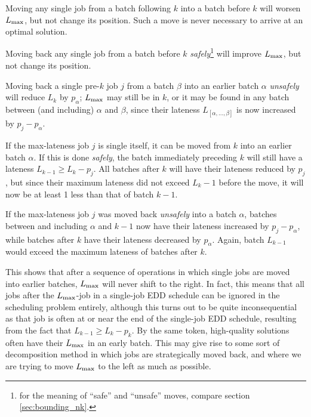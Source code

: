 \begin{alist}
\item{Moving any single job from a batch following $k$ into a batch before $k$ will
worsen $L_{\text{max}}$, but not change its position. Such a move is never necessary to
arrive at an optimal solution.}
\item{Moving back any single job from a
batch before $k$ \textit{safely}\footnote{for the meaning of ``safe'' and
``unsafe'' moves, compare section \ref{sec:bounding_nk}.} will improve $L_{\text{max}}$,
but not change its position.}
\item{Moving back a single pre-$k$ job $j$ from a batch
$\beta$ into an earlier batch $\alpha$ \textit{unsafely} will reduce $L_k$ by
$p_\alpha$; $L_{\text{max}}$ may still be in $k$, or it may be found in any batch between
(and including) $\alpha$ and $\beta$, since their lateness
$L_{[\alpha,\dots,\beta]}$ is now increased by $p_j - p_\alpha$.}
\item{If the
max-lateness job $j$ is single itself, it can be moved from $k$ into an earlier
batch $\alpha$. If this is done \textit{safely}, the batch immediately preceding
$k$ will still have a lateness $L_{k-1} \geq L_k - p_j$. All batches after $k$
will have their lateness reduced by $p_j$, but since their maximum lateness did
not exceed $L_k - 1$ before the move, it will now be at least 1 less than that
of batch $k-1$.}
\item{If the max-lateness job
$j$ was moved back \textit{unsafely} into a batch $\alpha$, batches between and
including $\alpha$ and $k-1$ now have their lateness increased by $p_j - p_\alpha$,
while batches after $k$ have their lateness decreased by $p_\alpha$. Again,
batch $L_{k-1}$ would exceed the maximum lateness of batches after $k$.}
\end{alist}

This shows that after a sequence of operations in which single jobs are moved into
earlier batches, $L_{\text{max}}$ will never shift to the right. In fact, this means that
all jobs after the $L_{\text{max}}$-job in a single-job EDD schedule can be ignored in
the scheduling problem entirely, although this turns out to be quite
inconsequential as that job is often at or near the end of the single-job EDD
schedule, resulting from the fact that $L_{k-1} \geq L_k - p_k$. By the same
token, high-quality solutions often have their $L_{\text{max}}$ in an early batch. This
may give rise to some sort of decomposition method in which jobs are
strategically moved back, and where we are trying to move $L_{\text{max}}$ to the left as
much as possible. 
